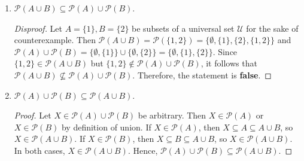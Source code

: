 \documentclass{article}
\theoremstyle{definition}
\begin{document}
\begin{enumerate}
\begin{enumerate}
  \item $\mathcal{P}(A \cup B) \subseteq \mathcal{P}(A) \cup \mathcal{P}(B)$.
  \begin{proof}[Disproof]
    Let $A=\{1\}, B=\{2\}$ be subsets of a universal set $\mathcal{U}$ 
    for the sake of counterexample. 
    Then $\mathcal{P}(A \cup B)=\mathcal{P}(\{1,2\})=\{\emptyset,\{1\},\{2\},\{1,2\}\}$ 
    and $\mathcal{P}(A) \cup \mathcal{P}(B)=\{\emptyset,\{1\}\} \cup \{\emptyset,\{2\}\}=\{\emptyset,\{1\},\{2\}\}$. Since $\{1,2\} \in \mathcal{P}(A \cup B)$ but $\{1,2\} \notin \mathcal{P}(A) \cup \mathcal{P}(B)$, it follows that $\mathcal{P}(A \cup B) \not\subseteq \mathcal{P}(A) \cup \mathcal{P}(B)$. 
    Therefore, the statement is \textbf{false}.
  \end{proof}

  \item $\mathcal{P}(A) \cup \mathcal{P}(B) \subseteq \mathcal{P}(A \cup B)$.
  \begin{proof}
    Let $X \in \mathcal{P}(A) \cup \mathcal{P}(B)$ be arbitrary. 
    Then $X \in \mathcal{P}(A)$ or $X \in \mathcal{P}(B)$ by definition of union. 
    If $X \in \mathcal{P}(A)$, then $X \subseteq A \subseteq A \cup B$, 
    so $X \in \mathcal{P}(A \cup B)$. If $X \in \mathcal{P}(B)$, 
    then $X \subseteq B \subseteq A \cup B$, so $X \in \mathcal{P}(A \cup B)$. 
    In both cases, $X \in \mathcal{P}(A \cup B)$. 
    Hence, $\mathcal{P}(A) \cup \mathcal{P}(B) \subseteq \mathcal{P}(A \cup B)$.
  \end{proof}
  \end{enumerate}



  
\end{enumerate}
\end{document}
